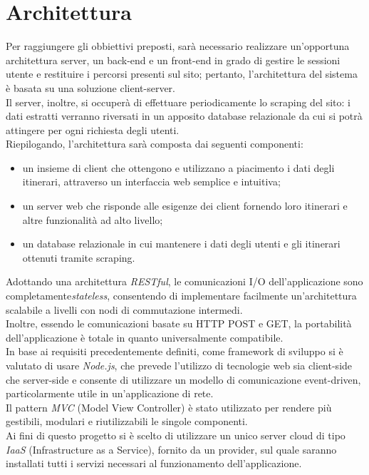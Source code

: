 \documentclass[11pt]{report}
\begin{document}
\pagebreak
\section{Architettura}
Per raggiungere gli obbiettivi preposti, sarà necessario realizzare un'opportuna architettura server, un back-end e un front-end in grado di gestire le sessioni utente e restituire i percorsi presenti sul sito; pertanto, l'architettura del sistema è basata su una soluzione client-server.
\\Il server, inoltre, si occuperà di effettuare periodicamente lo scraping del sito: i dati estratti verranno riversati in un apposito database relazionale da cui si potrà attingere per ogni richiesta degli utenti.
\\Riepilogando, l'architettura sarà composta dai seguenti componenti:
\begin{itemize}
	\item un insieme di client che ottengono e utilizzano a piacimento i dati degli itinerari, attraverso un interfaccia web semplice e intuitiva;
	\item un server web che risponde alle esigenze dei client fornendo loro itinerari e altre funzionalità ad alto livello;
	\item un database relazionale in cui mantenere i dati degli utenti e gli itinerari ottenuti tramite scraping.
\end{itemize}
Adottando una architettura \textit{RESTful}, le comunicazioni I/O dell'applicazione sono completamente\textit{stateless}, consentendo di implementare facilmente un'architettura scalabile a livelli con nodi di commutazione intermedi.
\\Inoltre, essendo le comunicazioni basate su HTTP POST e GET, la portabilità dell'applicazione è totale in quanto universalmente compatibile.
\\In base ai requisiti precedentemente definiti, come framework di sviluppo si è valutato di usare \textit{Node.js}, che prevede l'utilizzo di tecnologie web sia client-side che server-side e consente di utilizzare un modello di comunicazione event-driven, particolarmente utile in un'applicazione di rete.
\\Il pattern \textit{MVC} (Model View Controller) è stato utilizzato per rendere più gestibili, modulari e riutilizzabili le singole componenti.
\\Ai fini di questo progetto si è scelto di utilizzare un unico server cloud di tipo \textit{IaaS} (Infrastructure as a Service), fornito da un provider, sul quale saranno installati tutti i servizi necessari al funzionamento dell'applicazione.
\end{document}
